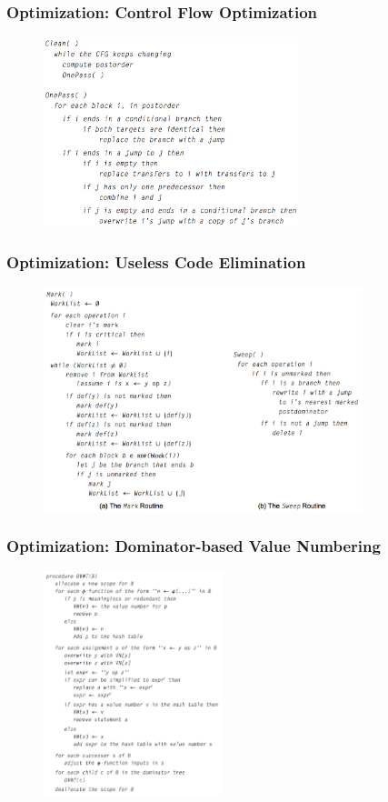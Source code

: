 \documentclass{beamer}
\begin{document}
	\begin{frame}
		\frametitle{Optimization: Control Flow Optimization}
		\begin{figure}[!htp]
			\includegraphics[height=5.5cm]{image/optimization/control-flow-optimization}
		\end{figure}
	\end{frame}

	\begin{frame}
		\frametitle{Optimization: Useless Code Elimination}
		\begin{figure}[!htp]
			\includegraphics[height=6.5cm]{image/optimization/useless-code-elimination}
		\end{figure}
	\end{frame}

	\begin{frame}
		\frametitle{Optimization: Dominator-based Value Numbering}
		\begin{figure}[!htp]
			\includegraphics[height=6.5cm]{image/optimization/dominator-based-value-numbering-technique}
		\end{figure}
	\end{frame}
\end{document}
